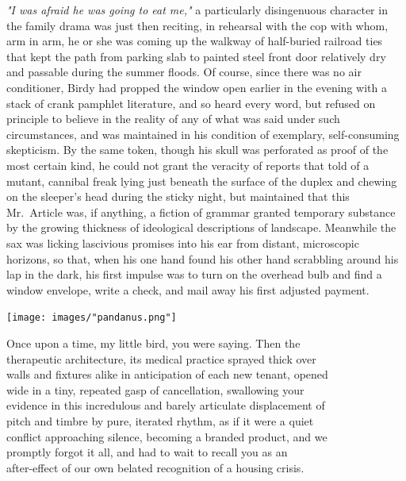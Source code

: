 \documentclass[
]{memoir}
\begin{document}
\emph{"I was afraid he was going to eat me,"} a particularly
disingenuous character in the family drama was just then reciting, in
rehearsal with the cop with whom, arm in arm, he or she was coming up
the walkway of half-buried railroad ties that kept the path from parking
slab to painted steel front door relatively dry and passable during the
summer floods. Of course, since there was no air conditioner, Birdy had
propped the window open earlier in the evening with a stack of crank
pamphlet literature, and so heard every word, but refused on principle
to believe in the reality of any of what was said under such
circumstances, and was maintained in his condition of exemplary,
self-consuming skepticism. By the same token, though his skull was
perforated as proof of the most certain kind, he could not grant the
veracity of reports that told of a mutant, cannibal freak lying just
beneath the surface of the duplex and chewing on the sleeper's head
during the sticky night, but maintained that this Mr.~Article was, if
anything, a fiction of grammar granted temporary substance by the
growing thickness of ideological descriptions of landscape. Meanwhile
the sax was licking lascivious promises into his ear from distant,
microscopic horizons, so that, when his one hand found his other hand
scrabbling around his lap in the dark, his first impulse was to turn on
the overhead bulb and find a window envelope, write a check, and mail
away his first adjusted payment.

\begin{center}\texttt{[image: images/"pandanus.png"]}\end{center}

Once upon a time, my little bird, you were saying. Then the\\
therapeutic architecture, its medical practice sprayed thick over\\
walls and fixtures alike in anticipation of each new tenant, opened\\
wide in a tiny, repeated gasp of cancellation, swallowing your\\
evidence in this incredulous and barely articulate displacement of\\
pitch and timbre by pure, iterated rhythm, as if it were a quiet\\
conflict approaching silence, becoming a branded product, and we\\
promptly forgot it all, and had to wait to recall you as an\\
after-effect of our own belated recognition of a housing crisis.
\end{document}

